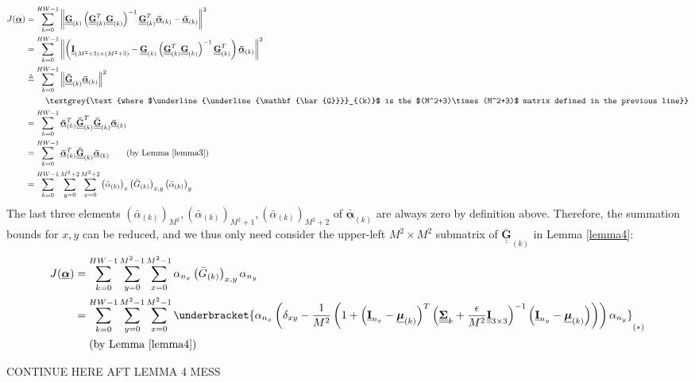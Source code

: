 \documentclass{article}
\def\vt#1{\underline{\mathbf{#1}}}
\def\vts#1{\underline{\boldsymbol{#1}}}
\def\mt#1{\underline{\underline{\mathbf{#1}}}}
\def\mts#1{\underline{\underline{\boldsymbol{#1}}}}
\begin{document}
\begin{align*}
    J(\vts\alpha) &=  \sum_{k=0}^{HW-1} \left\| \mt G_{(k)}\left(\mt G_{(k)}^T \mt G_{(k)} \right)^{-1} \mt G_{(k)}^T \vts{\bar{\alpha}}_{(k)}  - \vts{\bar{\alpha}}_{(k)} \right\|^2\\
    &=  \sum_{k=0}^{HW-1} \left\| \left(\mt I_{(M^2+3)\times(M^2+3)} -  \mt G_{(k)}\left(\mt G_{(k)}^T \mt G_{(k)} \right)^{-1} \mt G_{(k)}^T \right) \vts{\bar{\alpha}}_{(k)}   \right\|^2\\
    &\triangleq  \sum_{k=0}^{HW-1} \left\| \mt{\bar{G}}_{(k)} \vts{\bar{\alpha}}_{(k)}   \right\|^2\\
    &\quad\quad\ \textgrey{\text{where $\mt{\bar{G}}_{(k)}$ is the $(M^2+3)\times(M^2+3)$ matrix defined in the previous line}}\\
    &= \sum_{k=0}^{HW-1} \vts{\bar{\alpha}}_{(k)}^T \mt{\bar{G}}_{(k)}^T \mt{\bar{G}}_{(k)} \vts{\bar{\alpha}}_{(k)}\\
    &= \sum_{k=0}^{HW-1} \vts{\bar{\alpha}}_{(k)}^T  \mt{\bar{G}}_{(k)} \vts{\bar{\alpha}}_{(k)} \qquad\text{(by Lemma \ref{lemma3})}\\
    &= \sum_{k=0}^{HW-1} \sum_{y=0}^{M^2+2} \sum_{x=0}^{M^2+2} \left({\bar{\alpha}}_{(k)}\right)_x  \left({\bar{G}}_{(k)}\right)_{x,y} \left({\bar{\alpha}}_{(k)}\right)_y
\end{align*}
The last three elements $\left({\bar{\alpha}}_{(k)}\right)_{M^2}, \left({\bar{\alpha}}_{(k)}\right)_{M^2+1}, \left({\bar{\alpha}}_{(k)}\right)_{M^2+2}$ of $\vts{\bar{\alpha}}_{(k)}$ are always zero by definition above. Therefore, the summation bounds for $x,y$ can be reduced, and we thus only need consider the upper-left $M^2\times M^2$ submatrix of ${\mt{\bar{G}}}_{(k)}$ in Lemma \ref{lemma4}:
\begin{align*}
    J(\vts\alpha) &= \sum_{k=0}^{HW-1} \sum_{y=0}^{M^2-1} \sum_{x=0}^{M^2-1} \alpha_{n_x}  \left({\bar{G}}_{(k)}\right)_{x,y} \alpha_{n_y}\\
    &= \sum_{k=0}^{HW-1} \sum_{y=0}^{M^2-1} \sum_{x=0}^{M^2-1} \underbracket{\alpha_{n_x}  \left( \delta_{xy} - \frac1{M^2}\left(1 + \left(\vt{I}_{n_x} - \vts \mu_{(k)}\right)^T \left(\mts \Sigma_k + \frac\epsilon{M^2} \mt{I}_{3\times 3}\right)^{-1} \left(\vt{I}_{n_y} - \vts \mu_{(k)}\right) \right) \right) \alpha_{n_y}}_{(*)}\\
    &\quad\ \text{(by Lemma \ref{lemma4})}
\end{align*}

CONTINUE HERE AFT LEMMA 4 MESS
\end{document}
